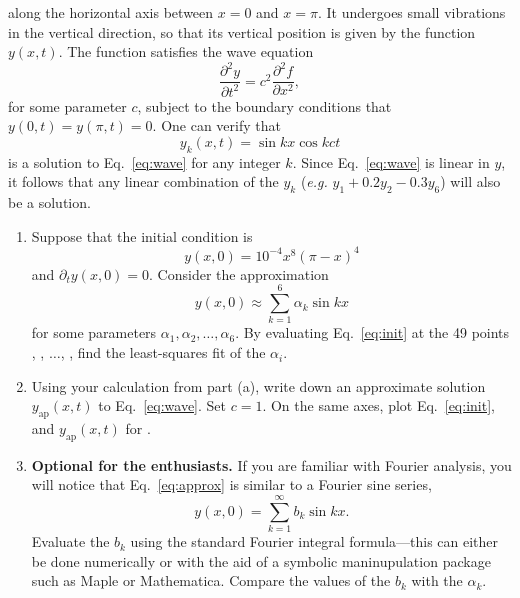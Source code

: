 \documentclass[12pt]{article}
\newcommand{\p}{\partial}
\begin{document}
\begin{enumerate}
    along the horizontal axis between $x=0$ and $x=\pi$. It undergoes small
    vibrations in the vertical direction, so that its vertical position is
    given by the function $y(x,t)$. The function satisfies the wave equation
    \begin{equation}
      \frac{\p^2 y}{\p t^2} = c^2 \frac{\p^2 f}{\p x^2},
      \label{eq:wave}
    \end{equation}
    for some parameter $c$, subject to the boundary conditions that
    $y(0,t)=y(\pi,t)=0$. One can verify that
    \begin{equation}
      y_k(x,t)= \sin kx \cos kct
    \end{equation}
    is a solution to Eq.~\ref{eq:wave} for any integer $k$. Since
    Eq.~\ref{eq:wave} is linear in $y$, it follows that any linear combination
    of the $y_k$ ({\it e.g.} $y_1+0.2y_2-0.3y_{6}$) will also be a solution.
    \begin{enumerate}
      \item Suppose that the initial condition is
	\begin{equation}
	  y(x,0) = 10^{-4}x^{8}(\pi-x)^4
	  \label{eq:init}
	\end{equation}
	and $\p_t y(x,0)=0$. Consider the approximation
	\begin{equation}
	  y(x,0) \approx \sum_{k=1}^6 \alpha_k \sin kx
	  \label{eq:approx}
	\end{equation}
	for some parameters $\alpha_1, \alpha_2, \ldots, \alpha_6$. By
	evaluating Eq.~\ref{eq:init} at the 49 points ,
	, $\ldots$, , find
	the least-squares fit of the $\alpha_i$.
      \item Using your calculation from part (a), write down an approximate
	solution $y_\text{ap}(x,t)$ to Eq.~\ref{eq:wave}. Set $c=1$. On the
	same axes, plot Eq.~\ref{eq:init}, and $y_\text{ap}(x,t)$ for
	.
      \item {\bf Optional for the enthusiasts.} If you are familiar with
	Fourier analysis, you will notice that Eq.~\ref{eq:approx} is similar
	to a Fourier sine series,
	\begin{equation}
	  y(x,0) = \sum_{k=1}^\infty b_k \sin kx.
	\end{equation}
	Evaluate the $b_k$ using the standard Fourier integral formula---this
	can either be done numerically or with the aid of a symbolic
	maninupulation package such as Maple or Mathematica. Compare the values
	of the $b_k$ with the $\alpha_k$.
    \end{enumerate}
\end{enumerate}
\end{document}
